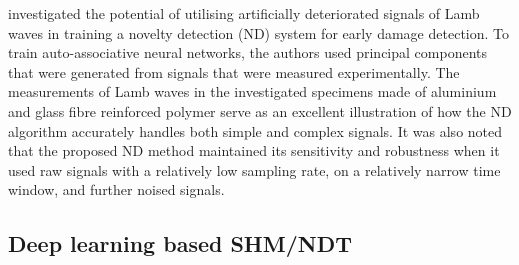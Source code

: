 \textcite{Nazarko2016} investigated the potential of utilising artificially deteriorated signals of Lamb waves in training a novelty detection (ND) system for early damage detection.
To train auto-associative neural networks, the authors used principal components that were generated from signals that were measured experimentally.
The measurements of Lamb waves in the investigated specimens made of aluminium and glass fibre reinforced polymer serve as an excellent illustration of how the ND algorithm accurately handles both simple and complex signals.
It was also noted that the proposed ND method maintained its sensitivity and robustness when it used raw signals with a relatively low sampling rate, on a relatively narrow time window, and further noised signals.
%
\subsection{Deep learning based SHM/NDT}

